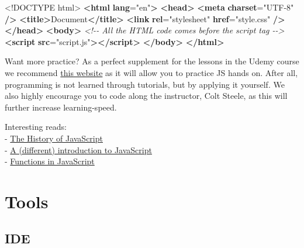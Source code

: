 \documentclass[
]{article}
\newenvironment{Shaded}{\begin{snugshade}}{\end{snugshade}}
\newcommand{\CommentTok}[1]{\textcolor[rgb]{0.56,0.35,0.01}{\textit{#1}}}
\newcommand{\DataTypeTok}[1]{\textcolor[rgb]{0.13,0.29,0.53}{#1}}
\newcommand{\ErrorTok}[1]{\textcolor[rgb]{0.64,0.00,0.00}{\textbf{#1}}}
\newcommand{\KeywordTok}[1]{\textcolor[rgb]{0.13,0.29,0.53}{\textbf{#1}}}
\newcommand{\NormalTok}[1]{#1}
\newcommand{\OtherTok}[1]{\textcolor[rgb]{0.56,0.35,0.01}{#1}}
\newcommand{\StringTok}[1]{\textcolor[rgb]{0.31,0.60,0.02}{#1}}
\begin{document}
\begin{Shaded}
\begin{Highlighting}[]
\DataTypeTok{\textless{}!DOCTYPE }\NormalTok{html}\DataTypeTok{\textgreater{}}
\KeywordTok{\textless{}html} \ErrorTok{lang}\OtherTok{=}\StringTok{"en"}\KeywordTok{\textgreater{}}
  \KeywordTok{\textless{}head\textgreater{}}
    \KeywordTok{\textless{}meta} \ErrorTok{charset}\OtherTok{=}\StringTok{"UTF{-}8"} \KeywordTok{/\textgreater{}}
    \KeywordTok{\textless{}title\textgreater{}}\NormalTok{Document}\KeywordTok{\textless{}/title\textgreater{}}
    \KeywordTok{\textless{}link} \ErrorTok{rel}\OtherTok{=}\StringTok{"stylesheet"} \ErrorTok{href}\OtherTok{=}\StringTok{"style.css"} \KeywordTok{/\textgreater{}}
  \KeywordTok{\textless{}/head\textgreater{}}
  \KeywordTok{\textless{}body\textgreater{}}
    \CommentTok{\textless{}!{-}{-} All the HTML code comes before the script tag {-}{-}\textgreater{}}
    \KeywordTok{\textless{}script} \ErrorTok{src}\OtherTok{=}\StringTok{"script.js"}\KeywordTok{\textgreater{}\textless{}/script\textgreater{}}
  \KeywordTok{\textless{}/body\textgreater{}}
\KeywordTok{\textless{}/html\textgreater{}}
\end{Highlighting}
\end{Shaded}

Want more practice? As a perfect supplement for the lessons in the Udemy course we recommend \href{https://learnjavascript.online/}{this website} as it will allow you to practice JS hands on. After all, programming is not learned through tutorials, but by applying it yourself. We also highly encourage you to code along the instructor, Colt Steele, as this will further increase learning-speed.

Interesting reads:\\
- \href{https://medium.com/@_benaston/lesson-1a-the-history-of-javascript-8c1ce3bffb17}{The History of JavaScript}\\
- \href{https://javascript.info/intro}{A (different) introduction to JavaScript}\\
- \href{https://javascript.info/function-basics}{Functions in JavaScript}

\hypertarget{tools}{%
\section{Tools}\label{tools}}

\hypertarget{ide}{%
\subsection{IDE}\label{ide}}
\end{document}
